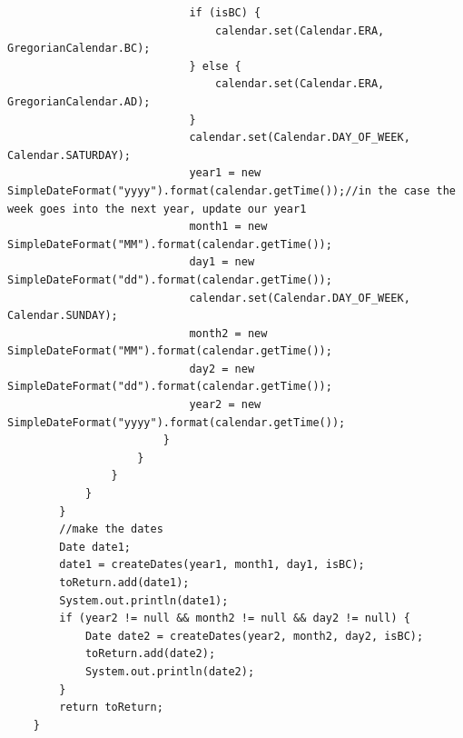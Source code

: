 \begin{lstlisting}
                            if (isBC) {
                                calendar.set(Calendar.ERA, GregorianCalendar.BC);
                            } else {
                                calendar.set(Calendar.ERA, GregorianCalendar.AD);
                            }
                            calendar.set(Calendar.DAY_OF_WEEK, Calendar.SATURDAY);
                            year1 = new SimpleDateFormat("yyyy").format(calendar.getTime());//in the case the week goes into the next year, update our year1
                            month1 = new SimpleDateFormat("MM").format(calendar.getTime());
                            day1 = new SimpleDateFormat("dd").format(calendar.getTime());
                            calendar.set(Calendar.DAY_OF_WEEK, Calendar.SUNDAY);
                            month2 = new SimpleDateFormat("MM").format(calendar.getTime());
                            day2 = new SimpleDateFormat("dd").format(calendar.getTime());
                            year2 = new SimpleDateFormat("yyyy").format(calendar.getTime());
                        }
                    }
                }
            }
        }
        //make the dates
        Date date1;
        date1 = createDates(year1, month1, day1, isBC);
        toReturn.add(date1);
        System.out.println(date1);
        if (year2 != null && month2 != null && day2 != null) {
            Date date2 = createDates(year2, month2, day2, isBC);
            toReturn.add(date2);
            System.out.println(date2);
        }
        return toReturn;
    }


\end{lstlisting}
